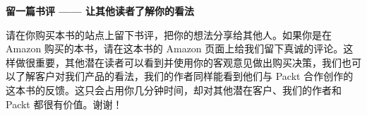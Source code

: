 \clearpage
{}
\begingroup
\parindent 0bp
\parskip 0bp
\vspace*{-15.7bp}%
{\sffamily\bfseries\fontsize{20bp}{24bp}\selectfont 留一篇书评 —— 让其他读者了解你的看法\par}
\vspace{29.6bp}
{\fontsize{10.5bp}{12.6bp}\selectfont
\noindent 请在你购买本书的站点上留下书评，把你的想法分享给其他人。如果你是在 Amazon 购买的本书，请在这本书的 Amazon 页面上给我们留下真诚的评论。这样做很重要，其他潜在读者可以看到并使用你的客观意见做出购买决策，我们也可以了解客户对我们产品的看法，我们的作者同样能看到他们与 Packt 合作创作的这本书的反馈。这只会占用你几分钟时间，却对其他潜在客户、我们的作者和 Packt 都很有价值。谢谢！\par}
\endgroup
